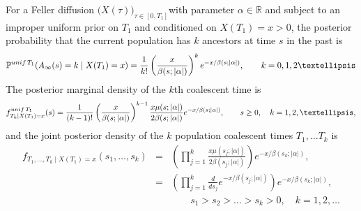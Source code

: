 \documentclass[10pt,a4paper]{amsart}
\begin{document}
\begin{theorem}	\label{theorem:unifT1Distribs}
For a Feller diffusion $\big(X(\tau)\big)_{\tau \in [0, T_1]}$with parameter $\alpha \in \mathbb{R}$ and  
subject to an improper uniform prior on $T_1$ and conditioned on $X(T_1) = x > 0$, the posterior probability 
that the current population has $k$ ancestors at time $s$ in the past is 
\begin{equation}		\label{PoisAncestors}
\mathbb{P}^{{\rm unif}\,T_1}(A_\infty(s) = k \mid X(T_1) = x) 
	= \frac{1}{k!} \left(\frac{x}{\beta(s; |\alpha|)} \right)^k e^{-x/\beta(s; |\alpha|)}, \qquad k = 0, 1, 2 \ldots
\end{equation}
The posterior marginal density of the $k$th coalescent time is 
\[
f_{T_k \mid X(T_1) = x}^{{\rm unif}\,T_1}(s) = 
	\frac{1}{(k - 1)!} \left(\frac{x}{\beta(s; |\alpha|)} \right)^{k - 1} \frac{x\mu(s; |\alpha|)}{2\beta(s; |\alpha|)} e^{-x/\beta(s; |\alpha|)}, \qquad s \ge 0,\quad k = 1, 2, \ldots,  
\]
and the joint posterior density of the $k$ population coalescent times $T_1, \ldots T_k$ is 
\begin{eqnarray*}
f_{T_1, \ldots, T_k \mid X(T_1) = x}(s_1, \ldots, s_k) & = & \left(\prod_{j = 1}^k \frac{x \mu(s_j; |\alpha|)}{2\beta(s_j; |\alpha|)} \right) e^{-x/\beta(s_k; |\alpha|)}, \nonumber \\
	& = & \left(\prod_{j = 1}^k \frac{d}{ds_j} e^{-x/\beta(s_j; |\alpha|)} \right) e^{-x/\beta(s_k; |\alpha|)}, \nonumber \\
	&  & \qquad s_1 > s_2 > \ldots > s_k > 0,\quad k = 1, 2, \ldots 
\end{eqnarray*}
\end{theorem}
\end{document}
